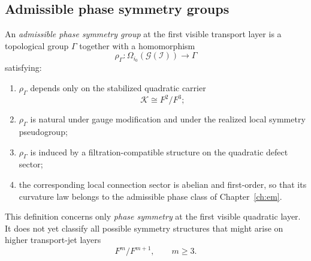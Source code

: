 \subsection{Admissible phase symmetry groups}
\begin{definition}
	\label{def:admissible-phase-group}
	An \emph{admissible phase symmetry group} at the first visible transport
	layer is a topological group $\Gamma$ together with a homomorphism
	\[
		\rho_\Gamma:\Omega_{i_0}(\mathcal G(\mathcal I))\to \Gamma
	\]
	satisfying:
	\begin{enumerate}
		\item $\rho_\Gamma$ depends only on the stabilized quadratic carrier
		      \[
			      \mathcal K\cong F^2/F^3;
		      \]
		\item $\rho_\Gamma$ is natural under gauge modification and under the
		      realized local symmetry pseudogroup;
		\item $\rho_\Gamma$ is induced by a filtration-compatible structure on
		      the quadratic defect sector;
		\item the corresponding local connection sector is abelian and
		      first-order, so that its curvature law belongs to the admissible phase
		      class of Chapter~\ref{ch:em}.
	\end{enumerate}
\end{definition}
\begin{remark}
	This definition concerns only \emph{phase symmetry} at the first visible
	quadratic layer.
	It does not yet classify all possible symmetry structures that might
	arise on higher transport-jet layers
	\[
		F^m/F^{m+1},\qquad m\ge 3.
	\]
\end{remark}
